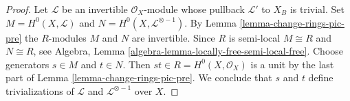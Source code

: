 \documentclass[10pt,a4paper]{amsart}
\theoremstyle{plain}
\theoremstyle{definition}
\theoremstyle{remark}
\numberwithin{equation}{subsection}
\begin{document}
\begin{proof}
Let $\mathcal{L}$ be an invertible $\mathcal{O}_X$-module
whose pullback $\mathcal{L}'$ to $X_B$ is trivial.
Set $M = H^0(X, \mathcal{L})$ and $N = H^0(X, \mathcal{L}^{\otimes - 1})$.
By Lemma \ref{lemma-change-rings-pic-pre} the $R$-modules $M$ and $N$ are
invertible. Since $R$ is semi-local $M \cong R$ and $N \cong R$, see
Algebra, Lemma \ref{algebra-lemma-locally-free-semi-local-free}.
Choose generators $s \in M$ and $t \in N$. Then
$st \in R = H^0(X, \mathcal{O}_X)$ is a unit by the last part
of Lemma \ref{lemma-change-rings-pic-pre}.
We conclude that $s$ and $t$ define trivializations of $\mathcal{L}$ and
$\mathcal{L}^{\otimes -1}$ over $X$.
\end{proof}
\end{document}
